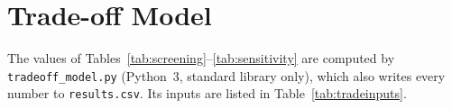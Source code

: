 \documentclass[11pt,a4paper]{article}
\begin{document}


\appendix
\section{Trade-off Model}\label{app:tradeoff}
The values of Tables~\ref{tab:screening}--\ref{tab:sensitivity} are computed by
\texttt{tradeoff\_model.py} (Python~3, standard library only), which also writes every
number to \texttt{results.csv}. Its inputs are listed in Table~\ref{tab:tradeinputs}.




\end{document}
